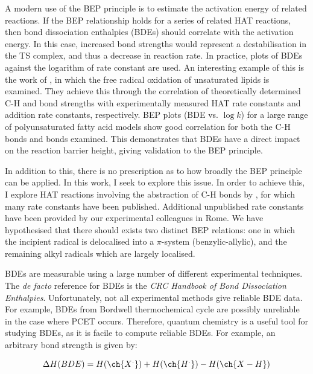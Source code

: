 A modern use of the BEP principle is to estimate the activation energy of related reactions. If the BEP relationship holds for a series of related HAT reactions, then bond dissociation enthalpies (BDEs) should correlate with the activation energy. In this case, increased bond strengths would represent a destabilisation in the TS complex, and thus a decrease in reaction rate. In practice, plots of BDEs against the logarithm of rate constant are used. An interesting example of this is the work of \citet{Pratt2003}, in which the free radical oxidation of unsaturated lipids is examined. They achieve this through the correlation of theoretically determined C-H and  bond strengths with experimentally measured HAT rate constants and  addition rate constants, respectively. BEP plots (BDE vs. $\log k$) for a large range of polyunsaturated fatty acid models show good correlation for both the C-H bonds and  bonds examined. This demonstrates that BDEs have a direct impact on the reaction barrier height, giving validation to the BEP principle.

In addition to this, there is no prescription as to how broadly the BEP principle can be applied. In this work, I seek to explore this issue. In order to achieve this, I explore HAT reactions involving the abstraction of C-H bonds by \cumo, for which many rate constants have been published.\cite{Bietti2010, Bietti2011, Pischel2001, Salamone2011, Salamone2012, Salamone2012a, Salamone2013, Salamone2015} Additional unpublished rate constants have been provided by our experimental colleagues in Rome. We have hypothesised that there should exists two distinct BEP relations: one in which the incipient radical is delocalised into a $\pi$-system (benzylic-allylic), and the remaining alkyl radicals which are largely localised.

BDEs are measurable using a large number of different experimental techniques. The \emph{de facto} reference for BDEs is the \emph{CRC Handbook of Bond Dissociation Enthalpies}.\cite{Luo2002} Unfortunately, not all experimental methods give reliable BDE data. For example, BDEs from Bordwell\cite{Bordwell1988} thermochemical cycle are possibly unreliable in the case where PCET occurs.\cite{Miller2016} Therefore, quantum chemistry is a useful tool for studying BDEs, as it is facile to compute reliable BDEs. For example, an arbitrary  bond strength is given by:

\begin{equation}
  \Delta H(BDE) =  H(\ch{X^.}) + H(\ch{H^.}) - H(\ch{X-H})
\end{equation}

